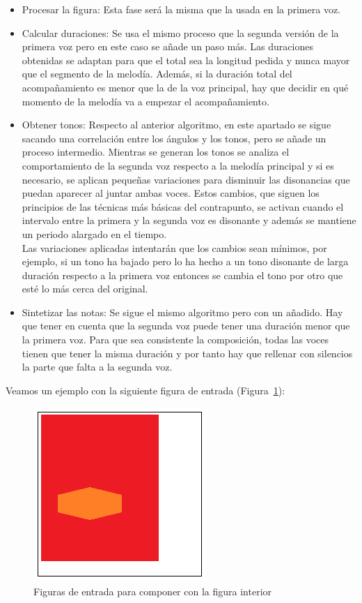 \begin{itemize}
	\item Procesar la figura: Esta fase será la misma que la usada en la primera voz.

	\item Calcular duraciones: Se usa el mismo proceso que la segunda versión de la primera voz pero en este caso se añade un paso más. Las duraciones obtenidas se adaptan para que el total sea la longitud pedida y nunca mayor que el segmento de la melodía. Además, si la duración total del acompañamiento es menor que la de la voz principal, hay que decidir en qué momento de la melodía va a empezar el acompañamiento.

	\item Obtener tonos: Respecto al anterior algoritmo, en este apartado se sigue sacando una correlación entre los ángulos y los tonos, pero se añade un proceso intermedio. Mientras se generan los tonos se analiza el comportamiento de la segunda voz respecto a la melodía principal y si es necesario, se aplican pequeñas variaciones para disminuir las disonancias que puedan aparecer al juntar ambas voces. Estos cambios, que siguen los principios de las técnicas más básicas del contrapunto, se activan cuando el intervalo entre la primera y la segunda voz es disonante y además se mantiene un periodo alargado en el tiempo. \\
Las variaciones aplicadas intentarán que los cambios sean mínimos, por ejemplo, si un tono ha bajado pero lo ha hecho a un tono disonante de larga duración respecto a la primera voz entonces se cambia el tono por otro que esté lo más cerca del original.

	\item Sintetizar las notas: Se sigue el mismo algoritmo pero con un añadido. Hay que tener en cuenta que la segunda voz puede tener una duración menor que la primera voz. Para que sea consistente la composición, todas las voces tienen que tener la misma duración y por tanto hay que rellenar con silencios la parte que falta a la segunda voz.

\end{itemize}

Veamos un ejemplo con la siguiente figura de entrada (Figura~\ref{fig:Figura0Voz2}):

		\begin{figure}[!htbp]
		\centering
		\hspace*{0.0in}
		\includegraphics[scale=1]{graphics/simpletest4.png}
		\caption{Figuras de entrada para componer con la figura interior}
		\label{fig:Figura0Voz2}
		\end{figure}


